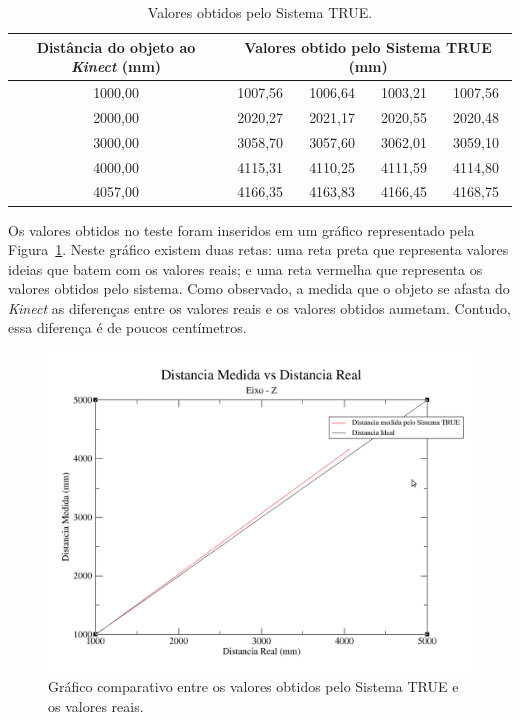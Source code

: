 		\begin{table}[h]
		\begin{center}
			\caption{Valores obtidos pelo Sistema TRUE.}
			\label{tab:valores-z}
			\begin{tabular}{|c|c|c|c|c|}
				\hline \bf Distância do objeto ao \textit{Kinect} (mm) & \multicolumn{4}{|c|}{\bf Valores obtido pelo Sistema TRUE (mm)} \\
				\hline
				\hline 1000,00 & 1007,56 & 1006,64 & 1003,21 & 1007,56 \\
				\hline 2000,00 & 2020,27 & 2021,17 & 2020,55 & 2020,48 \\
				\hline 3000,00 & 3058,70 & 3057,60 & 3062,01 & 3059,10 \\
				\hline 4000,00 & 4115,31 & 4110,25 & 4111,59 & 4114,80 \\
				\hline 4057,00 & 4166,35 & 4163,83 & 4166,45 & 4168,75 \\
				\hline
			\end{tabular}
		\end{center}
	\end{table}

	Os valores obtidos no teste foram inseridos em um gráfico representado pela Figura~\ref{fig:grafico-z}. Neste gráfico existem duas retas: uma reta preta que representa valores ideias que batem com os valores reais; e uma reta vermelha que representa os valores obtidos pelo sistema. Como observado, a medida que o objeto se afasta do \textit{Kinect} as diferenças entre os valores reais e os valores obtidos aumetam. Contudo, essa diferença é de poucos centímetros.

	\begin{figure}[htb]
		\begin{center}
			\includegraphics[scale=0.4]{figuras/5.Testes/grafico-eixo-z.png}
		\end{center}
		\caption{Gráfico comparativo entre os valores obtidos pelo Sistema TRUE e os valores reais.}
		\label{fig:grafico-z}
	\end{figure}

